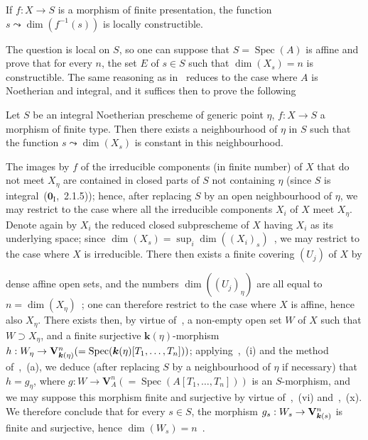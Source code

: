 \begin{proposition}[9.2.6.1]
\label{IV.9.2.6.1}
If $f:X\to S$ is a morphism of finite presentation, the function $s\leadsto\dim(f^{-1}(s))$ is locally constructible.
\end{proposition}

The question is local on $S$, so one can suppose that $S=\operatorname{Spec}(A)$ is affine and prove that for every $n$, the set $E$ of $s\in S$ such that $\dim(X_s)=n$ is constructible.
The same reasoning as in~ reduces to the case where $A$ is Noetherian and integral, and it suffices then to prove the following

\begin{corollary}[9.2.6.2]
\label{IV.9.2.6.2}
Let $S$ be an integral Noetherian prescheme of generic point $\eta$, $f:X\to S$ a morphism of finite type.
Then there exists a neighbourhood of $\eta$ in $S$ such that the function $s\leadsto\dim(X_s)$ is constant in this neighbourhood.
\end{corollary}

The images by $f$ of the irreducible components (in finite number) of $X$ that do not meet $X_\eta$ are contained in closed parts of $S$ not containing $\eta$ (since $S$ is integral~($\mathbf{0}_{\mathrm{I}}$,~2.1.5)); hence, after replacing $S$ by an open neighbourhood of $\eta$, we may restrict to the case where all the irreducible components $X_i$ of $X$ meet $X_\eta$.
Denote again by $X_i$ the reduced closed subprescheme of $X$ having $X_i$ as its underlying space; since $\dim(X_s)=\sup_i\dim((X_i)_s)$~, we may restrict to the case where $X$ is irreducible.
There then exists a finite covering $(U_j)$ of $X$ by

dense affine open sets, and the numbers $\dim((U_j)_\eta)$ are all equal to $n=\dim(X_\eta)$~; one can therefore restrict to the case where $X$ is affine, hence also $X_\eta$.
There exists then, by virtue of~, a non-empty open set $W$ of $X$ such that $W\supset X_\eta$, and a finite surjective $\boldsymbol{k}(\eta)$-morphism $h:W_\eta\to\mathbf{V}_{\boldsymbol{k}(\eta)}^n(=\operatorname{Spec}(\boldsymbol{k}(\eta)[T_1,\ldots,T_n]))$; applying~,~(i) and the method of~,~(a), we deduce (after replacing $S$ by a neighbourhood of $\eta$ if necessary) that $h=g_\eta$, where $g:W\to\mathbf{V}_A^n(=\operatorname{Spec}(A[T_1,\ldots,T_n]))$ is an $S$-morphism, and we may suppose this morphism finite and surjective by virtue of~,~(vi) and~,~(x).
We therefore conclude that for every $s\in S$, the morphism $g_s:W_s\to\mathbf{V}_{\boldsymbol{k}(s)}^n$ is finite and surjective, hence $\dim(W_s)=n$~.

